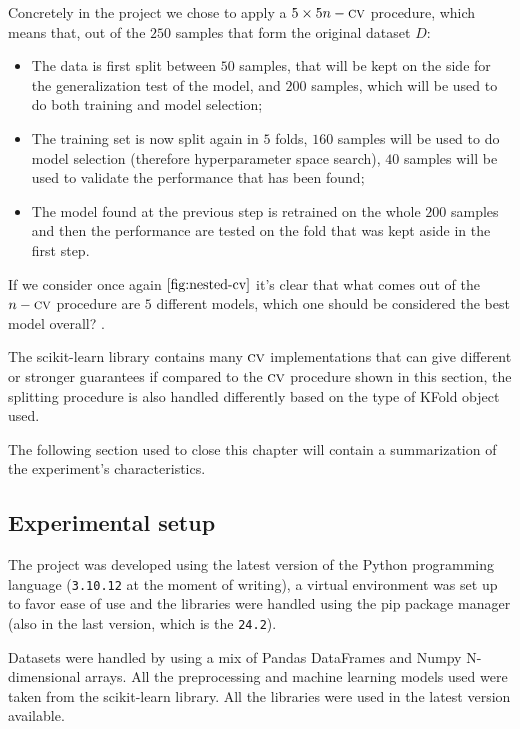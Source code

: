 Concretely in the project we chose to apply a $5 \times 5 n-\textsc{cv}$ procedure, which means that, out of
the $250$ samples that form the original dataset $D$:
\begin{itemize}
	\item The data is first split between $50$ samples, that will be kept on the side for the
	      generalization test of the model, and $200$ samples, which will be used to do both
	      training and model selection;
	\item The training set is now split again in $5$ folds, $160$ samples will be used to do
	      model selection (therefore hyperparameter space search), $40$ samples will be used
	      to validate the performance that has been found;
	\item The model found at the previous step is retrained on the whole $200$ samples and then
	      the performance are tested on the fold that was kept aside in the first step.
\end{itemize}
If we consider once again $\Cref{fig:nested-cv}$ it's clear that what comes out of the $n-\textsc{cv}$
procedure are $5$ different models, which one should be considered the best model overall? .

The scikit-learn library contains many $\textsc{cv}$ implementations that can give different or stronger
guarantees if compared to the $\textsc{cv}$ procedure shown in this section, the splitting procedure is also
handled differently based on the type of KFold object used.

The following section used to close this chapter will contain a summarization of the experiment's
characteristics.

\subsection{Experimental setup}
The project was developed using the latest version of the Python programming language
(\texttt{3.10.12} at the moment of writing), a virtual environment was set up to favor ease of use
and the libraries were handled using the pip package manager (also in the last version, which is the
\texttt{24.2}).

Datasets were handled by using a mix of Pandas DataFrames and Numpy N-dimensional arrays. All the
preprocessing and machine learning models used were taken from the scikit-learn library. All the
libraries were used in the latest version available.

